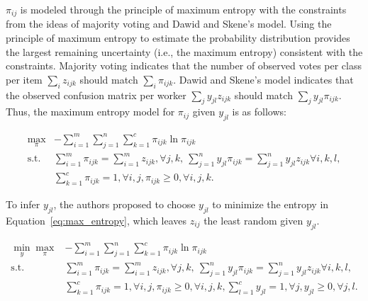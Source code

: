 \documentclass{article}
\begin{document}
$\pi_{ij}$ is modeled through the principle of maximum entropy with the
constraints from the ideas of majority voting and Dawid and Skene's
model. Using the principle of maximum entropy to estimate the
probability distribution provides the largest remaining uncertainty
(i.e., the maximum entropy) consistent with the constraints. Majority voting indicates that the number of observed votes per
class per item  $\sum_{i}z_{ijk}$ should match
$\sum_{i}\pi_{ijk}$. Dawid and Skene's model indicates that the
observed confusion matrix per worker $\sum_{j}y_{jl}z_{ijk}$ should match $\sum_{j}y_{jl}\pi_{ijk}$. Thus, the maximum entropy model for $\pi_{ij}$ given $y_{jl}$ is as
follows:

\begin{align}
\max_{\pi} & -\sum_{i=1}^{m}\sum_{j=1}^{n}\sum_{k=1}^{c} \pi_{ijk}
\ln \pi_{ijk} \nonumber \\
  \mathrm{s.t.} & \sum_{i=1}^{m}\pi_{ijk} = \sum_{i=1}^{m}z_{ijk},
                  \forall j,k, ~ \sum_{j=1}^{n}y_{jl}\pi_{ijk} =
                  \sum_{j=1}^{n}y_{jl}z_{ijk} \forall i,k,l, \nonumber
  \\
  & \sum_{k=1}^{c}\pi_{ijk}=1, \forall i,j, \pi_{ijk} \geq 0, \forall
    i,j,k. \label{eq:max_entropy}
\end{align}

To infer $y_{jl}$, the authors proposed to choose $y_{jl}$ to minimize the
entropy in Equation~\ref{eq:max_entropy}, which leaves $z_{ij}$ the
least random given $y_{jl}$.

\begin{align}
\min_{y}\max_{\pi} & -\sum_{i=1}^{m}\sum_{j=1}^{n}\sum_{k=1}^{c} \pi_{ijk}
\ln \pi_{ijk} \nonumber \\
  \mathrm{s.t.} & \sum_{i=1}^{m}\pi_{ijk} = \sum_{i=1}^{m}z_{ijk},
                  \forall j,k, ~ \sum_{j=1}^{n}y_{jl}\pi_{ijk} =
                  \sum_{j=1}^{n}y_{jl}z_{ijk} \forall i,k,l, \nonumber
  \\
  & \sum_{k=1}^{c}\pi_{ijk}=1, \forall i,j, \pi_{ijk} \geq 0, \forall
    i,j,k, \sum_{l=1}^{c}y_{jl}=1, \forall j, y_{jl} \geq 0, \forall
    j, l. \label{eq:minimax_entropy}
\end{align}
\end{document}
